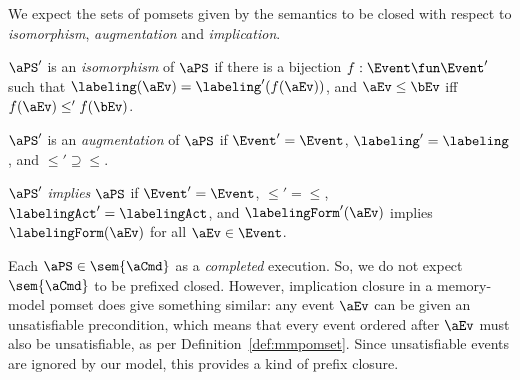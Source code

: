 We expect the sets of pomsets given by the semantics to be closed with
respect to \emph{isomorphism}, \emph{augmentation} and \emph{implication}.
\begin{definition}
  $\aPS'$ is an \emph{isomorphism} of $\aPS$ if there is a bijection
  $f:\Event\fun\Event'$ such that $\labeling(\aEv)=\labeling'(f(\aEv))$, and
  $\aEv\le\bEv$ iff $f(\aEv)\le'f(\bEv)$. %

  $\aPS'$ is an \emph{augmentation} of $\aPS$ if $\Event'=\Event$,
  ${\labeling'}={\labeling}$, and ${\le'}\supseteq{\le}$. %

  $\aPS'$ \emph{implies} $\aPS$ if $\Event'=\Event$, ${\le'}={\le}$,
  $\labelingAct'=\labelingAct$, and $\labelingForm'(\aEv)$
  implies $\labelingForm(\aEv)$ for all $\aEv\in\Event$.
\end{definition}
Each
$\aPS\in\sem{\aCmd}$ as a \emph{completed} execution.  So, we do not expect $\sem{\aCmd}$ to be prefixed closed.  However, implication
closure in a memory-model pomset does give something similar: any event
$\aEv$ can be given an unsatisfiable precondition, which means that every
event ordered after $\aEv$ must also be unsatisfiable, as per
Definition~\ref{def:mmpomset}.  Since unsatisfiable events are ignored by our model, this
provides a kind of prefix closure.



